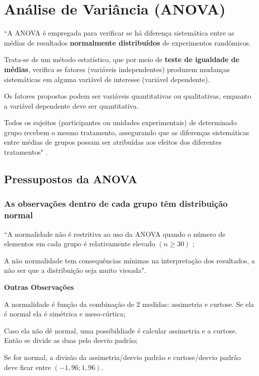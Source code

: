 \section{Análise de Variância (ANOVA)}

	``A ANOVA é empregada para verificar se há diferença sistemática entre as médias de resultados \textbf{normalmente distribuídos} de experimentos randômicos.
	
	Trata-se de um método estatístico, que por meio de
\textbf{teste de igualdade de médias}, verifica se fatores (variáveis independentes) produzem mudanças sistemáticas em alguma variável de interesse (variável dependente).

	Os fatores propostos podem ser variáveis quantitativas
ou qualitativas, enquanto a variável dependente deve ser quantitativa.

	Todos os sujeitos (participantes ou unidades experimentais) de determinado grupo recebem o mesmo tratamento, assegurando que as diferenças sistemáticas entre médias de grupos possam ser atribuídas aos efeitos dos diferentes tratamentos" \cite{torres} .

	\subsection{Pressupostos da ANOVA \cite{torres}}

			\subsubsection{As observações dentro de cada grupo têm distribuição normal}
			
				``A normalidade não é restritiva ao uso da ANOVA quando o número de elementos em cada grupo é relativamente elevado $(n \geq 30)$ ;

				A não normalidade tem consequências mínimas na interpretação dos resultados, a não ser que a distribuição seja muito viesada".

				\textbf{Outras Observações}

					A normalidade é função da combinação de 2 medidas: assimetria e curtose. Se ela é normal ela é simétrica e meso-cúrtica;

					Caso ela não dê normal, uma possibildiade é calcular assimetria e a curtose. Então se divide as duas pelo desvio padrão;

					Se for normal, a divisão da assimetria/desvio padrão e curtose/desvio padrão deve ficar entre $ (-1,96 ; 1,96) $.

